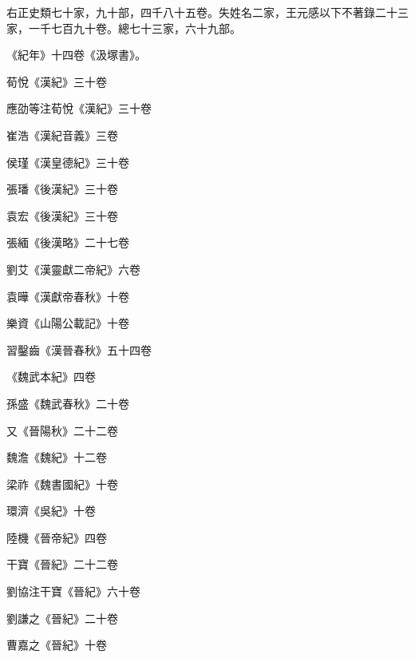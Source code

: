 \begin{pinyinscope}
 右正史類七十家，九十部，四千八十五卷。失姓名二家，王元感以下不著錄二十三家，一千七百九十卷。總七十三家，六十九部。



 《紀年》十四卷《汲塚書》。



 荀悅《漢紀》三十卷



 應劭等注荀悅《漢紀》三十卷



 崔浩《漢紀音義》三卷



 侯瑾《漢皇德紀》三十卷



 張璠《後漢紀》三十卷



 袁宏《後漢紀》三十卷



 張緬《後漢略》二十七卷



 劉艾《漢靈獻二帝紀》六卷



 袁曄《漢獻帝春秋》十卷



 樂資《山陽公載記》十卷



 習鑿齒《漢晉春秋》五十四卷



 《魏武本紀》四卷



 孫盛《魏武春秋》二十卷



 又《晉陽秋》二十二卷



 魏澹《魏紀》十二卷



 梁祚《魏書國紀》十卷



 環濟《吳紀》十卷



 陸機《晉帝紀》四卷



 干寶《晉紀》二十二卷



 劉協注干寶《晉紀》六十卷



 劉謙之《晉紀》二十卷



 曹嘉之《晉紀》十卷




\end{pinyinscope}
